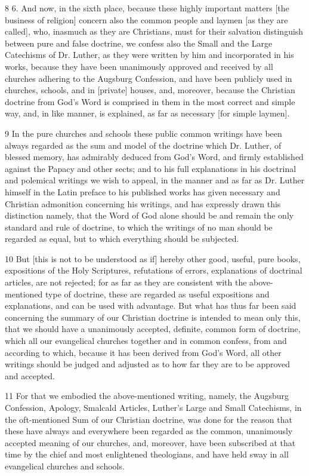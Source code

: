 8 6. And now, in the sixth place, because these highly important matters [the business of religion] concern also the common people and laymen [as they are called], who, inasmuch as they are Christians, must for their salvation distinguish between pure and false doctrine, we confess also the Small and the Large Catechisms of Dr. Luther, as they were written by him and incorporated in his works, because they have been unanimously approved and received by all churches adhering to the Augsburg Confession, and have been publicly used in churches, schools, and in [private] houses, and, moreover, because the Christian doctrine from God’s Word is comprised in them in the most correct and simple way, and, in like manner, is explained, as far as necessary [for simple laymen].

9 In the pure churches and schools these public common writings have been always regarded as the sum and model of the doctrine which Dr. Luther, of blessed memory, has admirably deduced from God’s Word, and firmly established against the Papacy and other sects; and to his full explanations in his doctrinal and polemical writings we wish to appeal, in the manner and as far as Dr. Luther himself in the Latin preface to his published works has given necessary and Christian admonition concerning his writings, and has expressly drawn this distinction namely, that the Word of God alone should be and remain the only standard and rule of doctrine, to which the writings of no man should be regarded as equal, but to which everything should be subjected.

10 But [this is not to be understood as if] hereby other good, useful, pure books, expositions of the Holy Scriptures, refutations of errors, explanations of doctrinal articles, are not rejected; for as far as they are consistent with the above-mentioned type of doctrine, these are regarded as useful expositions and explanations, and can be used with advantage. But what has thus far been said concerning the summary of our Christian doctrine is intended to mean only this, that we should have a unanimously accepted, definite, common form of doctrine, which all our evangelical churches together and in common confess, from and according to which, because it has been derived from God’s Word, all other writings should be judged and adjusted as to how far they are to be approved and accepted.

11 For that we embodied the above-mentioned writing, namely, the Augsburg Confession, Apology, Smalcald Articles, Luther’s Large and Small Catechisms, in the oft-mentioned Sum of our Christian doctrine, was done for the reason that these have always and everywhere been regarded as the common, unanimously accepted meaning of our churches, and, moreover, have been subscribed at that time by the chief and most enlightened theologians, and have held sway in all evangelical churches and schools.

